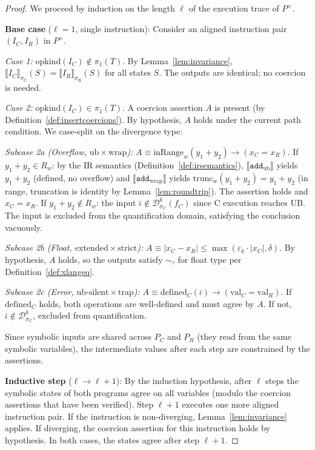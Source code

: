 \documentclass[11pt]{article}
\newcommand{\SemConfigC}{\sigma_{\mathrm{C}}}
\newcommand{\SemConfigR}{\sigma_{\mathrm{R}}}
\newcommand{\trunc}{\mathrm{trunc}}
\newcommand{\inRange}{\mathrm{inRange}}
\newcommand{\opkind}{\mathrm{opkind}}
\begin{document}
\begin{proof}
We proceed by induction on the length $\ell$ of the execution trace of $P^\times$.

\textbf{Base case} ($\ell = 1$, single instruction): Consider an aligned instruction pair $(I_C, I_R)$ in $P^\times$.

\emph{Case 1:} $\opkind(I_C) \notin \pi_1(T)$. By Lemma~\ref{lem:invariance}, $\llbracket I_C \rrbracket_{\SemConfigC}(S) = \llbracket I_R \rrbracket_{\SemConfigR}(S)$ for all states $S$. The outputs are identical; no coercion is needed.

\emph{Case 2:} $\opkind(I_C) \in \pi_1(T)$. A coercion assertion $A$ is present (by Definition~\ref{def:insertcoercions}). By hypothesis, $A$ holds under the current path condition. We case-split on the divergence type:

\emph{Subcase 2a (Overflow, $\mathrm{ub} \times \mathrm{wrap}$):} $A \equiv \inRange_w(y_1 + y_2) \to (x_C = x_R)$. If $y_1 + y_2 \in R_w$: by the IR semantics (Definition~\ref{def:irsemantics}), $\llbracket \texttt{add}_{\mathrm{ub}} \rrbracket$ yields $y_1 + y_2$ (defined, no overflow) and $\llbracket \texttt{add}_{\mathrm{wrap}} \rrbracket$ yields $\trunc_w(y_1 + y_2) = y_1 + y_2$ (in range, truncation is identity by Lemma~\ref{lem:roundtrip}). The assertion holds and $x_C = x_R$. If $y_1 + y_2 \notin R_w$: the input $\bar{\iota} \notin \mathcal{D}^k_{\SemConfigC}(f_C)$ since C execution reaches UB. The input is excluded from the quantification domain, satisfying the conclusion vacuously.

\emph{Subcase 2b (Float, $\mathrm{extended} \times \mathrm{strict}$):} $A \equiv |x_C - x_R| \leq \max(\varepsilon_k \cdot |x_C|, \delta)$. By hypothesis, $A$ holds, so the outputs satisfy $\sim_\tau$ for float type per Definition~\ref{def:xlangeq}.

\emph{Subcase 2c (Error, $\mathrm{ub\text{-}silent} \times \mathrm{trap}$):} $A \equiv \mathrm{defined}_C(\bar{\iota}) \to (\mathrm{val}_C = \mathrm{val}_R)$. If $\mathrm{defined}_C$ holds, both operations are well-defined and must agree by $A$. If not, $\bar{\iota} \notin \mathcal{D}^k_{\SemConfigC}$, excluded from quantification.

Since symbolic inputs are shared across $P_C$ and $P_R$ (they read from the same symbolic variables), the intermediate values after each step are constrained by the assertions.

\textbf{Inductive step} ($\ell \to \ell + 1$): By the induction hypothesis, after $\ell$ steps the symbolic states of both programs agree on all variables (modulo the coercion assertions that have been verified). Step $\ell + 1$ executes one more aligned instruction pair. If the instruction is non-diverging, Lemma~\ref{lem:invariance} applies. If diverging, the coercion assertion for this instruction holds by hypothesis. In both cases, the states agree after step $\ell + 1$.


\end{proof}
\end{document}
